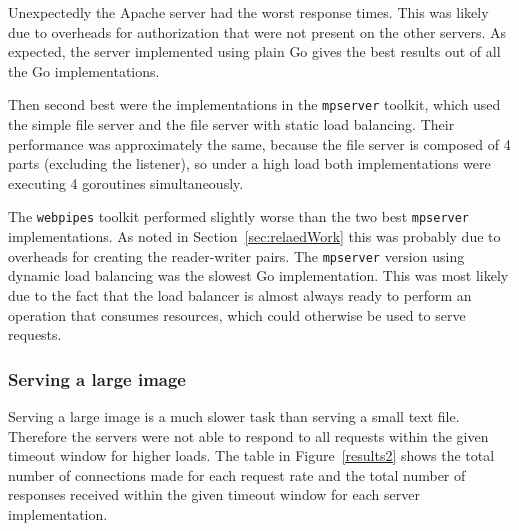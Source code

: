 Unexpectedly the Apache server had the worst response times. This was likely due to 
overheads for authorization that were not present on the other servers. As expected,
the server implemented using plain Go gives the best results out of all the Go
implementations. 

Then second best were the implementations in the \texttt{mpserver}
toolkit, which used the simple file server and the file server with static load 
balancing. Their performance was approximately the same, because the file server is composed of 
4 parts (excluding the listener), so under a high load both implementations 
were executing 4 goroutines simultaneously. 

The \texttt{webpipes} toolkit performed slightly worse than the two best
\texttt{mpserver} implementations. As noted in Section~\ref{sec:relaedWork} this was probably
due to overheads for creating the reader-writer pairs.
The \texttt{mpserver} version using dynamic load balancing was the slowest Go implementation.
This was most likely due to the fact that the load balancer is almost always ready to perform
an operation that consumes resources, which could otherwise be used to serve requests.

\subsubsection{Serving a large image}
Serving a large image is a much slower task than serving a small text file.
Therefore the servers were not able to respond to all requests within the
given timeout window for higher loads. The table in Figure~\ref{results2} shows
the total number of connections made for each request rate and the total number
of responses received within the given timeout window for each server implementation.

